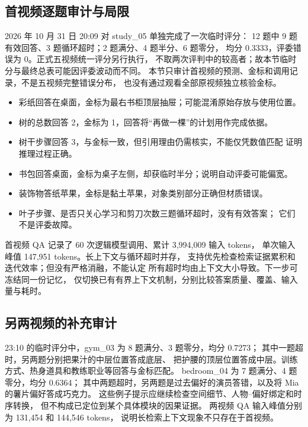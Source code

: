 \subsection{首视频逐题审计与局限}
2026 年 10 月 31 日 20:09 对 study\_05 单独完成了一次临时评分：
12 题中 9 题有效回答、3 题循环超时；2 题满分、4 题半分、6 题零分，
均分 0.3333，评委错误为 0。正式五视频统一评分另行执行，
不取两次评判中的较高者；故本节临时分与最终总表可能因评委波动而不同。
本节只审计首视频的预测、金标和调用记录，不是五视频完整错误分布，
也没有通过观看全部原视频独立核验金标。

\begin{itemize}
\item 彩纸回答在桌面，金标为最右书柜顶层抽屉；可能混淆原始存放与使用位置。
\item 树的总数回答 2，金标为 1，回答将``再做一棵''的计划用作完成依据。
\item 树干步骤回答 3，与金标一致，但引用理由仍需核实，不能仅凭数值匹配
证明推理过程正确。
\item 书包回答桌面，金标为桌子左侧，却获临时半分；说明自动评委可能偏宽。
\item 装饰物答纸苹果，金标是黏土苹果，对象类别部分正确但材质错误。
\item 叶子步骤、是否只关心学习和剪刀次数三题循环超时，没有有效答案；
它们不是评委故障。
\end{itemize}

首视频 QA 记录了 60 次逻辑模型调用、累计 3,994,009 输入 tokens，
单次输入峰值 147,951 tokens。长上下文与循环超时并存，
支持优先检查检索证据累积和迭代效率；但没有严格消融，不能认定
所有超时均由上下文大小导致。下一步可冻结同一份记忆，
仅切换已有有界上下文机制，分别比较答案质量、覆盖、输入量与耗时。

\subsection{另两视频的补充审计}
23:10 的临时评分中，gym\_03 为 8 题满分、3 题零分，均分 0.7273；
其中一题超时，另两题分别把果汁的中层位置答成底层、
把护腰的顶层位置答成中层。训练方式、热身道具和教练职业等回答与金标匹配。
bedroom\_04 为 7 题满分、4 题零分，均分 0.6364；
其中两题超时，另两题是过去偏好的演员答错，以及将 Mia 的薯片偏好答成巧克力。
这些例子提示应继续检查空间细节、人物--偏好绑定和时序转换，
但不构成已定位到某个具体模块的因果证据。
两视频 QA 输入峰值分别为 131,454 和 144,546 tokens，
说明长检索上下文现象不只存在于首视频。
